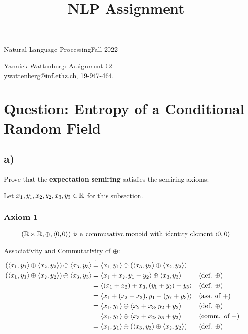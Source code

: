 \documentclass[a4paper,12pt]{ETHexercise}
\title{NLP Assignment}
\begin{document}



{}
{\Large Natural Language Processing}{Fall 2022}
\begin{center}
    {\Huge Yannick Wattenberg: Assignment 02}\\
      \quad\newline
      ywattenberg@inf.ethz.ch, 19-947-464.\\
      \quad\newline
    \timestamp

\end{center}
\section{Question: Entropy of a Conditional Random Field}
\subsection*{a)}
Prove that the \textbf{expectation semiring} satisfies the semiring axioms:

Let $x_1, y_1, x_2, y_2, x_3, y_3 \in \mathbb{R}$ for this subsection.
\subsubsection*{Axiom 1}
\begin{align*}
    (\mathbb{R} \times \mathbb{R}, \oplus, \langle0, 0\rangle) \text{ is a commutative monoid with identity element } \langle0, 0\rangle
\end{align*}

Associativity and Commutativity of $\oplus$:
\begin{align}
    (\langle x_1, y_1\rangle \oplus \langle x_2, y_2\rangle) \oplus \langle x_3, y_3\rangle &\stackrel{!}{=} \langle x_1, y_1\rangle \oplus (\langle x_3, y_3\rangle \oplus \langle x_2, y_2\rangle)\\
     (\langle x_1, y_1\rangle \oplus \langle x_2, y_2\rangle) \oplus \langle x_3, y_3\rangle &= \langle x_1+x_2, y_1+y_2\rangle \oplus \langle x_3, y_3\rangle &&(\text{def. } \oplus)\\
     &= \langle(x_1+x_2)+x_3, (y_1+y_2)+y_3\rangle &&(\text{def. } \oplus)\\
     &= \langle x_1+(x_2+x_3), y_1+(y_2+y_3)\rangle &&(\text{ass. of } +)\\
     &= \langle x_1, y_1\rangle \oplus \langle x_2+x_3, y_2+y_3\rangle&&(\text{def. } \oplus)\\
     &= \langle x_1, y_1\rangle \oplus \langle x_3+x_2, y_3+y_2\rangle&&(\text{comm. of }+)\\
     &= \langle x_1, y_1\rangle \oplus (\langle x_3, y_3\rangle \oplus \langle x_2, y_2\rangle) &&(\text{def. } \oplus)
\end{align}
\end{document}
